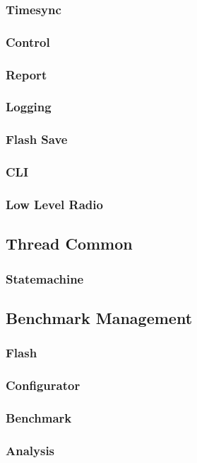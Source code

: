 \subsubsection{Timesync}\label{subsubsec:Timesync}

\subsubsection{Control}\label{subsubsec:Control}

\subsubsection{Report}\label{subsubsec:Report}

\subsubsection{Logging}\label{subsubsec:Logging}

\subsubsection{Flash Save}\label{subsubsec:FlashSave}

\subsubsection{CLI}\label{subsubsec:CLI}

\subsubsection{Low Level Radio}\label{subsubsec:LowLevelRadio}



\subsection{Thread Common}\label{subsec:ThreadCommon}

\subsubsection{Statemachine}\label{subsubsec:Statemachine}



\subsection{Benchmark Management}\label{subsec:Benchmark Management}

\subsubsection{Flash}\label{subsubsec:Flash}

\subsubsection{Configurator}\label{subsubsec:Configurator}

\subsubsection{Benchmark}\label{subsubsec:Benchmark}

\subsubsection{Analysis}\label{subsubsec:Analysis}

